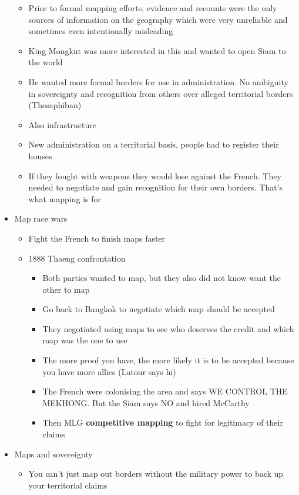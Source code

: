 \documentclass[a4paper]{article}
\begin{document}
\begin{itemize}
\begin{itemize}[label=$\circ$]
		\item Prior to formal mapping efforts, evidence and recounts were the only sources of information on the geography which were very unreliable and sometimes even intentionally misleading
		\item King Mongkut was more interested in this and wanted to open Siam to the world
		\item He wanted more formal borders for use in administration. No ambiguity in sovereignty and recognition from others over alleged territorial borders (Thesaphiban)
		\item Also infrastructure
		\item New administration on a territorial basis, people had to register their houses
		\item If they fought with weapons they would lose against the French. They needed to negotiate and gain recognition for their own borders. That's what mapping is for
	\end{itemize}
	\newpage
	\item Map race wars
	\begin{itemize}[label=$\circ$]
		\item Fight the French to finish maps faster
		\item 1888 Thaeng confrontation
		\begin{itemize}[label=\tiny$\blacksquare$]
			\item Both parties wanted to map, but they also did not know want the other to map
			\item Go back to Bangkok to negotiate which map should be accepted
			\item They negotiated using maps to see who deserves the credit and which map was the one to use
			\item The more proof you have, the more likely it is to be accepted because you have more allies (Latour says hi)
			\item The French were colonising the area and says WE CONTROL THE MEKHONG. But the Siam says NO and hired McCarthy
			\item Then MLG \textbf{competitive mapping} to fight for legitimacy of their claims
		\end{itemize}
	\end{itemize}
	\item Maps and sovereignty
	\begin{itemize}[label=$\circ$]
		\item You can't just map out borders without the military power to back up your territorial claims

\end{itemize}
\end{itemize}
\end{document}
